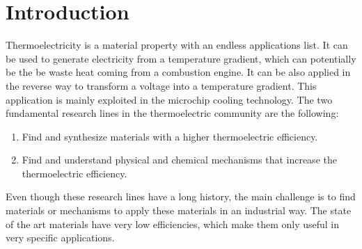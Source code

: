 
\chapter*{Introduction} %

\label{Chapter0} %


Thermoelectricity is a material property with an endless applications list. It can be used to generate electricity 
from a temperature gradient\cite{li2009thermoelectric,yang2006thermoelectric}, which can potentially be the be waste heat coming from a combustion engine. It can be 
also applied in the reverse way to transform a voltage into a temperature gradient. This application is mainly 
exploited in the microchip cooling technology\cite{disalvo1999thermoelectric,zhao2014review}. The two fundamental 
research lines in the thermoelectric community are the following: 
\begin{enumerate}
\item Find and synthesize materials with a higher thermoelectric efficiency.
\item Find and understand physical and chemical mechanisms that increase the thermoelectric efficiency. 
\end{enumerate}	
Even though these research lines have a long history, the main challenge is to find materials or mechanisms to apply 
these materials in an industrial way. The state of the art materials have very low efficiencies, which make them 
only useful in very specific applications. \\

